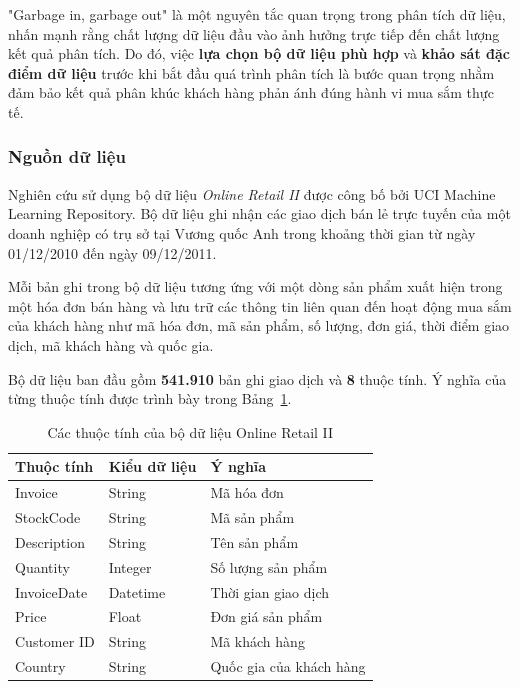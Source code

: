 \documentclass[12pt]{ai_conquer2026}
\begin{document}
"Garbage in, garbage out" là một nguyên tắc quan trọng trong phân tích dữ liệu, nhấn mạnh rằng chất lượng dữ liệu đầu vào ảnh hưởng trực tiếp đến chất lượng kết quả phân tích. Do đó, việc \textbf{lựa chọn bộ dữ liệu phù hợp} và \textbf{khảo sát đặc điểm dữ liệu} trước khi bắt đầu quá trình phân tích là bước quan trọng nhằm đảm bảo kết quả phân khúc khách hàng phản ánh đúng hành vi mua sắm thực tế.

\subsubsection{Nguồn dữ liệu}

Nghiên cứu sử dụng bộ dữ liệu \textit{Online Retail II} được công bố bởi UCI Machine Learning Repository. Bộ dữ liệu ghi nhận các giao dịch bán lẻ trực tuyến của một doanh nghiệp có trụ sở tại Vương quốc Anh trong khoảng thời gian từ ngày 01/12/2010 đến ngày 09/12/2011.

Mỗi bản ghi trong bộ dữ liệu tương ứng với một dòng sản phẩm xuất hiện trong một hóa đơn bán hàng và lưu trữ các thông tin liên quan đến hoạt động mua sắm của khách hàng như mã hóa đơn, mã sản phẩm, số lượng, đơn giá, thời điểm giao dịch, mã khách hàng và quốc gia.

Bộ dữ liệu ban đầu gồm \textbf{541.910} bản ghi giao dịch và \textbf{8} thuộc tính. Ý nghĩa của từng thuộc tính được trình bày trong Bảng~\ref{tab:raw_data_structure}.

\begin{table}[H]
\centering
\caption{Các thuộc tính của bộ dữ liệu Online Retail II}
\label{tab:raw_data_structure}
\renewcommand{\arraystretch}{1.2}
\begin{tabular}{lll}
\toprule
\textbf{Thuộc tính} &
\textbf{Kiểu dữ liệu} &
\textbf{Ý nghĩa} \\
\midrule
Invoice &
String &
Mã hóa đơn \\

StockCode &
String &
Mã sản phẩm \\

Description &
String &
Tên sản phẩm \\

Quantity &
Integer &
Số lượng sản phẩm \\

InvoiceDate &
Datetime &
Thời gian giao dịch \\

Price &
Float &
Đơn giá sản phẩm \\

Customer ID &
String &
Mã khách hàng \\

Country &
String &
Quốc gia của khách hàng \\
\bottomrule
\end{tabular}
\end{table}
\end{document}
